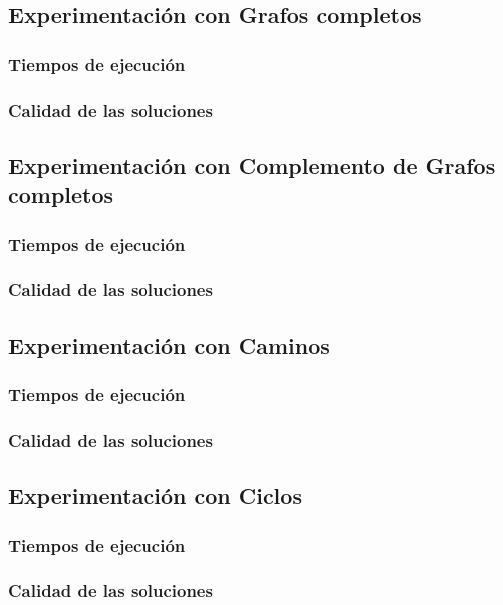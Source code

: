 \subsection{Experimentación con Grafos completos}
\subsubsection{Tiempos de ejecución}

\subsubsection{Calidad de las soluciones}

\subsection{Experimentación con Complemento de Grafos completos}
\subsubsection{Tiempos de ejecución}

\subsubsection{Calidad de las soluciones}

\subsection{Experimentación con Caminos}
\subsubsection{Tiempos de ejecución}

\subsubsection{Calidad de las soluciones}

\subsection{Experimentación con Ciclos}
\subsubsection{Tiempos de ejecución}

\subsubsection{Calidad de las soluciones}

